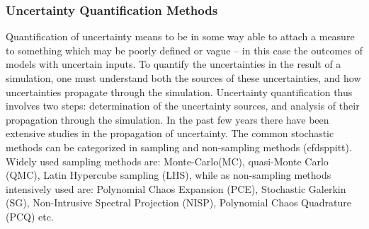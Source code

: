 \documentclass{article}
\begin{document}
\subsubsection{Uncertainty Quantification Methods} Quantification of uncertainty means to be in some way able to attach a measure
to something which may be poorly defined or vague \citep{Matthies2008} -- in this case the outcomes of models 
with uncertain inputs. 
To quantify the uncertainties in the result of a simulation, one must understand 
both the sources of these uncertainties, and how uncertainties propagate through the simulation. 
Uncertainty quantification thus involves two steps: determination of the uncertainty sources, and 
analysis of their propagation through the simulation. In the past few years there have been 
extensive studies in the propagation of uncertainty. The common stochastic methods can be
categorized in sampling and non-sampling methods (cfdsppitt). Widely used sampling methods
are: Monte-Carlo(MC), quasi-Monte Carlo (QMC), Latin Hypercube sampling (LHS), while as 
non-sampling methods intensively used are:  Polynomial Chaos Expansion (PCE), Stochastic Galerkin (SG),
Non-Intrusive Spectral Projection (NISP), Polynomial Chaos Quadrature (PCQ) etc. 
\end{document}
